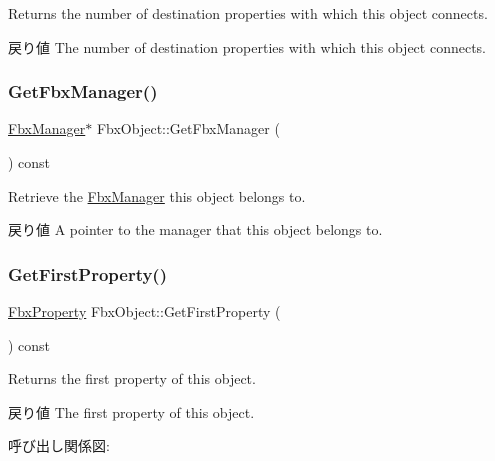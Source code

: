 Returns the number of destination properties with which this object connects. \begin{DoxyReturn}{戻り値}
The number of destination properties with which this object connects. 
\end{DoxyReturn}
\mbox{\label{class_fbx_object_aa9871c290d977c2ef1c268193699863c}} 
\subsubsection{\texorpdfstring{Get\+Fbx\+Manager()}{GetFbxManager()}}
{\footnotesize\ttfamily \hyperlink{class_fbx_manager}{Fbx\+Manager}$\ast$ Fbx\+Object\+::\+Get\+Fbx\+Manager (\begin{DoxyParamCaption}{ }\end{DoxyParamCaption}) const}

Retrieve the \hyperlink{class_fbx_manager}{Fbx\+Manager} this object belongs to. \begin{DoxyReturn}{戻り値}
A pointer to the manager that this object belongs to. 
\end{DoxyReturn}
\mbox{\label{class_fbx_object_abc7d6efa0f0b7f0037818b8700465077}} 
\subsubsection{\texorpdfstring{Get\+First\+Property()}{GetFirstProperty()}}
{\footnotesize\ttfamily \hyperlink{class_fbx_property}{Fbx\+Property} Fbx\+Object\+::\+Get\+First\+Property (\begin{DoxyParamCaption}{ }\end{DoxyParamCaption}) const}

Returns the first property of this object. \begin{DoxyReturn}{戻り値}
The first property of this object. 
\end{DoxyReturn}
呼び出し関係図\+:
\mbox{\label{class_fbx_object_a396d7a8496c2eef786ce73bac59ab55a}} 
